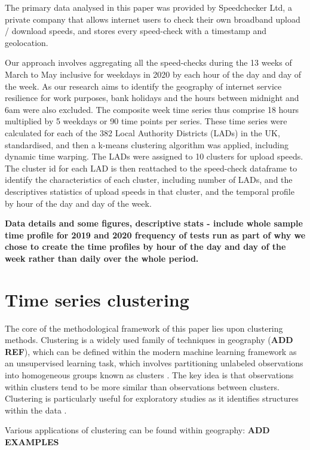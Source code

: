 \documentclass[]{interact}
\theoremstyle{plain}%
\theoremstyle{definition}
\theoremstyle{remark}
\begin{document}
The primary data analysed in this paper was provided by Speedchecker
Ltd, a private company that allows internet users to check their own
broadband upload / download speeds, and stores every speed-check with a
timestamp and geolocation.

Our approach involves aggregating all the speed-checks during the 13
weeks of March to May inclusive for weekdays in 2020 by each hour of the
day and day of the week. As our research aims to identify the geography
of internet service resilience for work purposes, bank holidays and the
hours between midnight and 6am were also excluded. The composite week
time series thus comprise 18 hours multiplied by 5 weekdays or 90 time
points per series. These time series were calculated for each of the 382
Local Authority Districts (LADs) in the UK, standardised, and then a
k-means clustering algorithm was applied, including dynamic time
warping. The LADs were assigned to 10 clusters for upload speeds. The
cluster id for each LAD is then reattached to the speed-check dataframe
to identify the characteristics of each cluster, including number of
LADs, and the descriptives statistics of upload speeds in that cluster,
and the temporal profile by hour of the day and day of the week.

\textbf{Data details and some figures, descriptive stats - include whole
sample time profile for 2019 and 2020 frequency of tests run as part of
why we chose to create the time profiles by hour of the day and day of
the week rather than daily over the whole period.}

\hypertarget{time-series-clustering}{%
\section{Time series clustering}\label{time-series-clustering}}

The core of the methodological framework of this paper lies upon
clustering methods. Clustering is a widely used family of techniques in
geography (\textbf{ADD REF}), which can be defined within the modern
machine learning framework as an unsupervised learning task, which
involves partitioning unlabeled observations into homogeneous groups
known as clusters \citep{montero2014tsclust}. The key idea is that
observations within clusters tend to be more similar than observations
between clusters. Clustering is particularly useful for exploratory
studies as it identifies structures within the data
\citep{aghabozorgi2015time}.

Various applications of clustering can be found within geography:
\textbf{ADD EXAMPLES}
\end{document}
